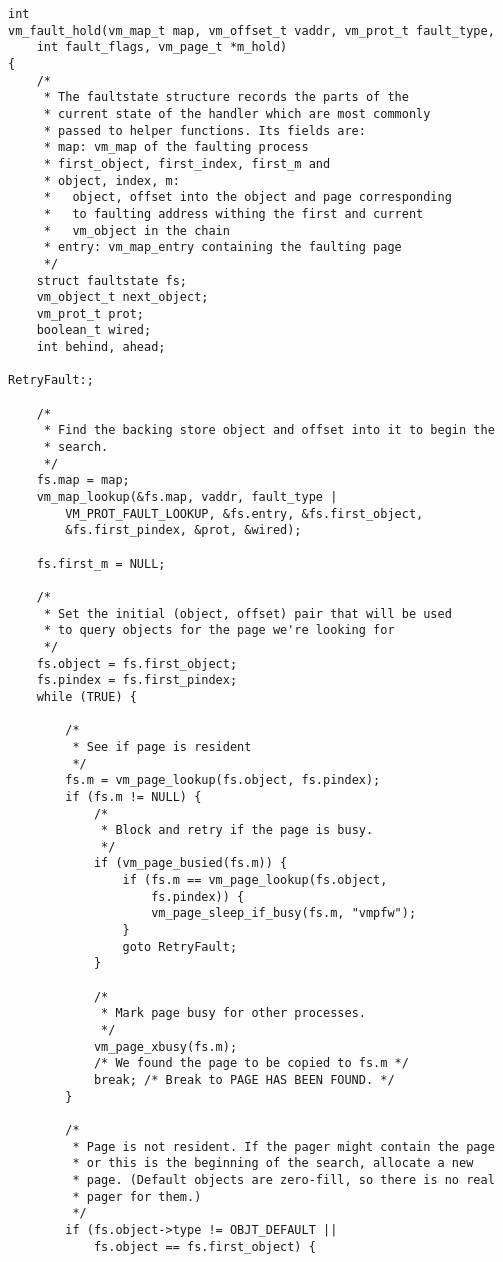 \documentclass[shortabstract, english]{iithesis}
\newenvironment{code}{}{}
\begin{document}
\begin{code}
\begin{verbatim}
int
vm_fault_hold(vm_map_t map, vm_offset_t vaddr, vm_prot_t fault_type,
    int fault_flags, vm_page_t *m_hold)
{
    /*
     * The faultstate structure records the parts of the
     * current state of the handler which are most commonly
     * passed to helper functions. Its fields are:
     * map: vm_map of the faulting process
     * first_object, first_index, first_m and
     * object, index, m:
     *   object, offset into the object and page corresponding
     *   to faulting address withing the first and current
     *   vm_object in the chain
     * entry: vm_map_entry containing the faulting page
     */
    struct faultstate fs;
    vm_object_t next_object;
    vm_prot_t prot;
    boolean_t wired;
    int behind, ahead;

RetryFault:;

    /*
     * Find the backing store object and offset into it to begin the
     * search.
     */
    fs.map = map;
    vm_map_lookup(&fs.map, vaddr, fault_type |
        VM_PROT_FAULT_LOOKUP, &fs.entry, &fs.first_object,
        &fs.first_pindex, &prot, &wired);

    fs.first_m = NULL;

    /*
     * Set the initial (object, offset) pair that will be used
     * to query objects for the page we're looking for
     */
    fs.object = fs.first_object;
    fs.pindex = fs.first_pindex;
    while (TRUE) {

        /*
         * See if page is resident
         */
        fs.m = vm_page_lookup(fs.object, fs.pindex);
        if (fs.m != NULL) {
            /*
             * Block and retry if the page is busy.
             */
            if (vm_page_busied(fs.m)) {
                if (fs.m == vm_page_lookup(fs.object,
                    fs.pindex)) {
                    vm_page_sleep_if_busy(fs.m, "vmpfw");
                }
                goto RetryFault;
            }

            /*
             * Mark page busy for other processes.
             */
            vm_page_xbusy(fs.m);
            /* We found the page to be copied to fs.m */
            break; /* Break to PAGE HAS BEEN FOUND. */
        }

        /*
         * Page is not resident. If the pager might contain the page
         * or this is the beginning of the search, allocate a new
         * page. (Default objects are zero-fill, so there is no real
         * pager for them.)
         */
        if (fs.object->type != OBJT_DEFAULT ||
            fs.object == fs.first_object) {


\end{verbatim}
\end{code}
\end{document}
